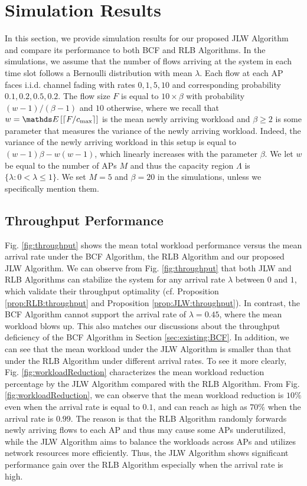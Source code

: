 \documentclass[10pt, conference, letterpaper]{IEEEtran} %
\begin{document}
\section{Simulation Results}
\label{sec:simulation}
In this section, we provide simulation results for our proposed JLW Algorithm and compare its performance to both BCF and RLB Algorithms. In the simulations, we assume that the number of flows arriving at the system in each time slot follows a Bernoulli distribution with mean $\lambda$. Each flow at each AP faces i.i.d. channel fading with rates $0, 1, 5, 10$ and corresponding probability $0.1, 0.2, 0.5, 0.2$. The flow size $F$ is equal to $10\times\beta$ with probability $(w-1)/(\beta-1)$ and $10$ otherwise, where we recall that $w=\bE\left[\lceil F/c_{\max}\rceil\right]$ is the mean newly arriving workload and $\beta\geq2$ is some parameter that measures the variance of the newly arriving workload. Indeed, the variance of the newly arriving workload in this setup is equal to $(w-1)\beta-w(w-1)$, which linearly increases with the parameter $\beta$. We let $w$ be equal to the number of APs $M$ and thus the capacity region $\Lambda$ is $\{\lambda:0<\lambda\leq1\}$. We set $M=5$ and $\beta=20$ in the simulations, unless we specifically mention them. 

\subsection{Throughput Performance}

Fig. \ref{fig:throughput} shows the mean total workload performance versus the mean arrival rate under the BCF Algorithm, the RLB Algorithm and our proposed JLW Algorithm. We can observe from Fig. \ref{fig:throughput} that both JLW and RLB Algorithms can stabilize the system for any arrival rate $\lambda$ between $0$ and $1$, which validate their throughput optimality (cf. Proposition \ref{prop:RLB:throughput} and Proposition \ref{prop:JLW:throughput}). In contrast, the BCF Algorithm cannot support the arrival rate of $\lambda=0.45$, where the mean workload blows up. This also matches our discussions about the throughput deficiency of the BCF Algorithm in Section \ref{sec:existing:BCF}. In addition, we can see that the mean workload under the JLW Algorithm is smaller than that under the RLB Algorithm under different arrival rates. To see it more clearly, Fig. \ref{fig:workloadReduction} characterizes the mean workload reduction percentage by the JLW Algorithm compared with the RLB Algorithm. From Fig. \ref{fig:workloadReduction}, we can observe that the mean workload reduction is $10\%$ even when the arrival rate is equal to $0.1$, and can reach as high as $70\%$ when the arrival rate is $0.99$. The reason is that the RLB Algorithm randomly forwards newly arriving flows to each AP and thus may cause some APs underutilized, while the JLW Algorithm aims to balance the workloads across APs and utilizes network resources more efficiently. Thus, the JLW Algorithm shows significant performance gain over the RLB Algorithm especially when the arrival rate is high.
\end{document}
